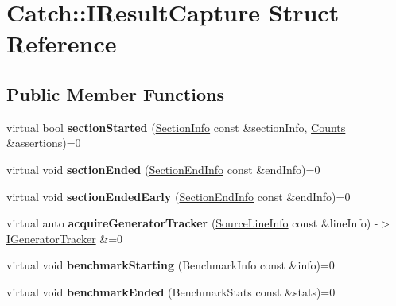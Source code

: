 \hypertarget{structCatch_1_1IResultCapture}{}\section{Catch\+:\+:I\+Result\+Capture Struct Reference}
\label{structCatch_1_1IResultCapture}
\subsection*{Public Member Functions}
\begin{DoxyCompactItemize}
\item 
virtual bool {\bfseries section\+Started} (\hyperlink{structCatch_1_1SectionInfo}{Section\+Info} const \&section\+Info, \hyperlink{structCatch_1_1Counts}{Counts} \&assertions)=0\hypertarget{structCatch_1_1IResultCapture_a5b76ed52badcb64cf374202e12b81a03}{}\label{structCatch_1_1IResultCapture_a5b76ed52badcb64cf374202e12b81a03}

\item 
virtual void {\bfseries section\+Ended} (\hyperlink{structCatch_1_1SectionEndInfo}{Section\+End\+Info} const \&end\+Info)=0\hypertarget{structCatch_1_1IResultCapture_a4e152bc43dc0933684e31fa67a58195d}{}\label{structCatch_1_1IResultCapture_a4e152bc43dc0933684e31fa67a58195d}

\item 
virtual void {\bfseries section\+Ended\+Early} (\hyperlink{structCatch_1_1SectionEndInfo}{Section\+End\+Info} const \&end\+Info)=0\hypertarget{structCatch_1_1IResultCapture_afcc71eef8ca821ae132cced4a2be6988}{}\label{structCatch_1_1IResultCapture_afcc71eef8ca821ae132cced4a2be6988}

\item 
virtual auto {\bfseries acquire\+Generator\+Tracker} (\hyperlink{structCatch_1_1SourceLineInfo}{Source\+Line\+Info} const \&line\+Info) -\/$>$ \hyperlink{structCatch_1_1IGeneratorTracker}{I\+Generator\+Tracker} \&=0\hypertarget{structCatch_1_1IResultCapture_ab020d111e29ad1cabe1227dcfda712ef}{}\label{structCatch_1_1IResultCapture_ab020d111e29ad1cabe1227dcfda712ef}

\item 
virtual void {\bfseries benchmark\+Starting} (Benchmark\+Info const \&info)=0\hypertarget{structCatch_1_1IResultCapture_a264ae12330c74b2daae41715a30d51bf}{}\label{structCatch_1_1IResultCapture_a264ae12330c74b2daae41715a30d51bf}

\item 
virtual void {\bfseries benchmark\+Ended} (Benchmark\+Stats const \&stats)=0\hypertarget{structCatch_1_1IResultCapture_a6e5e64f9d94211a888249012ab6cc7fb}{}\label{structCatch_1_1IResultCapture_a6e5e64f9d94211a888249012ab6cc7fb}


\end{DoxyCompactItemize}
